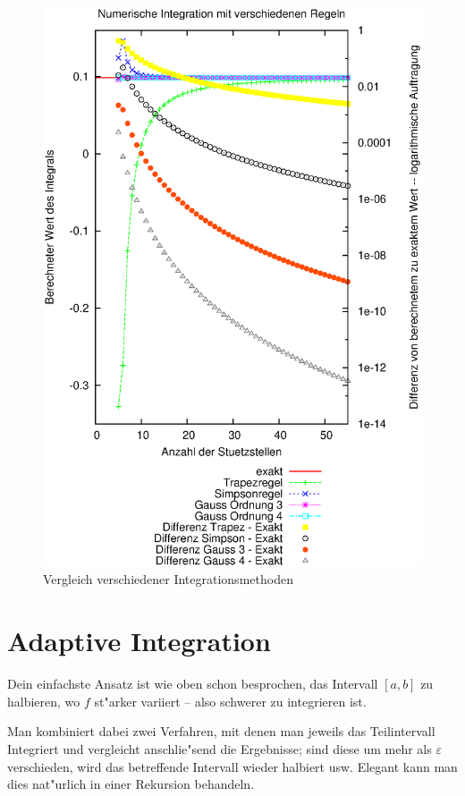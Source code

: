\documentclass[a4paper]{book}
\begin{document}
\begin{figure}
  \centering
  \includegraphics[width=\textwidth]{./bilder/vgl-int}
  \caption{Vergleich verschiedener Integrationsmethoden}
  \label{fig:vgl-integr}
\end{figure}


\section{Adaptive Integration}
\label{sec:adaptive_integration}

Dein einfachste Ansatz ist wie oben schon besprochen, das Intervall
$[a,b]$ zu halbieren, wo $f$ st"arker variiert -- also schwerer zu
integrieren ist.

Man kombiniert dabei zwei Verfahren, mit denen man jeweils das
Teilintervall Integriert und vergleicht anschlie"send die Ergebnisse;
sind diese um mehr als $\varepsilon$ verschieden, wird das betreffende
Intervall wieder halbiert usw.  Elegant kann man dies nat"urlich in
einer Rekursion behandeln.
\end{document}
